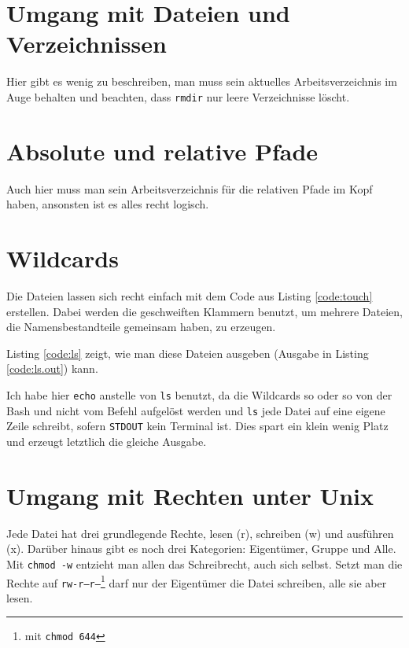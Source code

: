 \section{Umgang mit Dateien und Verzeichnissen}

Hier gibt es wenig zu beschreiben, man muss sein aktuelles Arbeitsverzeichnis im Auge behalten und beachten, dass \texttt{rmdir} nur leere Verzeichnisse löscht.

\section{Absolute und relative Pfade}

Auch hier muss man sein Arbeitsverzeichnis für die relativen Pfade im Kopf haben, ansonsten ist es alles recht logisch.

\section{Wildcards}

Die Dateien lassen sich recht einfach mit dem Code aus Listing \ref{code:touch} erstellen. Dabei werden die geschweiften Klammern benutzt, um mehrere Dateien, die Namensbestandteile gemeinsam haben, zu erzeugen.


Listing \ref{code:ls} zeigt, wie man diese Dateien ausgeben (Ausgabe in Listing \ref{code:ls.out}) kann.


Ich habe hier \texttt{echo} anstelle von \texttt{ls} benutzt, da die Wildcards so oder so von der Bash und nicht vom Befehl aufgelöst werden und \texttt{ls} jede Datei auf eine eigene Zeile schreibt, sofern \texttt{STDOUT} kein Terminal ist. Dies spart ein klein wenig Platz und erzeugt letztlich die gleiche Ausgabe.

\section{Umgang mit Rechten unter Unix}

Jede Datei hat drei grundlegende Rechte, lesen (r), schreiben (w) und ausführen (x). Darüber hinaus gibt es noch drei Kategorien: Eigentümer, Gruppe und Alle. Mit \texttt{chmod -w} entzieht man allen das Schreibrecht, auch sich selbst. Setzt man die Rechte auf \texttt{rw-r--r--}\footnote{mit \texttt{chmod 644}} darf nur der Eigentümer die Datei schreiben, alle sie aber lesen.

